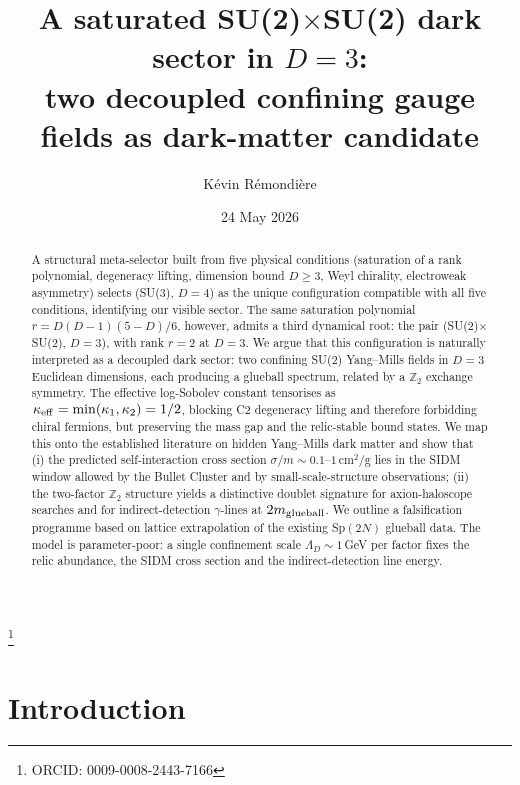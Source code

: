 \documentclass[aps,prd,twocolumn,nofootinbib,superscriptaddress,floatfix]{revtex4-2}
\begin{document}
\title{A saturated SU(2)$\times$SU(2) dark sector in $D=3$:\\
two decoupled confining gauge fields as dark-matter candidate}

\author{K\'evin R\'emondi\`ere}
\thanks{ORCID: 0009-0008-2443-7166}

\date{24 May 2026}

\begin{abstract}
A structural meta-selector built from five physical conditions (saturation of a rank polynomial, degeneracy lifting, dimension bound $D\geq 3$, Weyl chirality, electroweak asymmetry) selects (SU(3), $D=4$) as the unique configuration compatible with all five conditions, identifying our visible sector. The same saturation polynomial $r=D(D-1)(5-D)/6$, however, admits a third dynamical root: the pair (SU(2)$\times$SU(2), $D=3$), with rank $r=2$ at $D=3$. We argue that this configuration is naturally interpreted as a decoupled dark sector: two confining SU(2) Yang--Mills fields in $D=3$ Euclidean dimensions, each producing a glueball spectrum, related by a $\mathbb{Z}_2$ exchange symmetry. The effective log-Sobolev constant tensorises as $\kappa_{\rm eff}=\min(\kappa_1,\kappa_2)=1/2$, blocking C2 degeneracy lifting and therefore forbidding chiral fermions, but preserving the mass gap and the relic-stable bound states. We map this onto the established literature on hidden Yang--Mills dark matter and show that (i) the predicted self-interaction cross section $\sigma/m\sim 0.1$--$1\,\mathrm{cm}^2/\mathrm{g}$ lies in the SIDM window allowed by the Bullet Cluster and by small-scale-structure observations; (ii) the two-factor $\mathbb{Z}_2$ structure yields a distinctive doublet signature for axion-haloscope searches and for indirect-detection $\gamma$-lines at $2 m_{\rm glueball}$. We outline a falsification programme based on lattice extrapolation of the existing Sp$(2N)$ glueball data. The model is parameter-poor: a single confinement scale $\Lambda_D\sim 1\,$GeV per factor fixes the relic abundance, the SIDM cross section and the indirect-detection line energy.
\end{abstract}

\maketitle

\section{Introduction}
\label{sec:intro}
\end{document}
